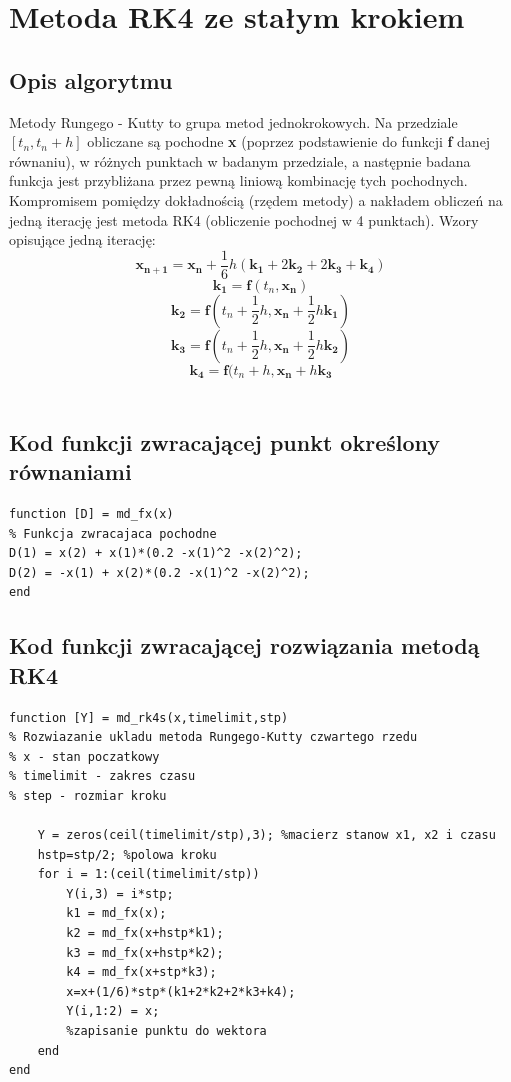 \documentclass[a4paper, 12pt]{article}
\begin{document}
\section{Metoda RK4 ze stałym krokiem}

\subsection{Opis algorytmu}
Metody Rungego - Kutty to grupa metod jednokrokowych. Na przedziale $[t_{n}, t_{n} + h]$ obliczane są pochodne \textbf{x} (poprzez podstawienie do funkcji \textbf{f} danej równaniu), w różnych punktach w badanym przedziale, a następnie badana funkcja jest przybliżana przez pewną liniową kombinację tych pochodnych. Kompromisem pomiędzy dokładnością (rzędem metody) a nakładem obliczeń na jedną iterację jest metoda RK4 (obliczenie pochodnej w 4 punktach). Wzory opisujące jedną iterację:
$$ \mathbf{x_{n+1}} = \mathbf{x_{n}} + \frac{1}{6}h(\mathbf{k_{1}} + 2\mathbf{k_{2}} + 2\mathbf{k_{3}} + \mathbf{k_{4}})$$
$$\mathbf{k_{1}} = \mathbf{f}(t_{n}, \mathbf{x_{n}})$$
$$\mathbf{k_{2}} = \mathbf{f}(t_{n}+\frac{1}{2}h, \mathbf{x_{n}} + \frac{1}{2}h\mathbf{k_{1}})$$
$$\mathbf{k_{3}} = \mathbf{f}(t_{n}+\frac{1}{2}h, \mathbf{x_{n}} + \frac{1}{2}h\mathbf{k_{2}})$$
$$\mathbf{k_{4}} = \mathbf{f}(t_{n}+h, \mathbf{x_{n}} + h\mathbf{k_{3}}$$\\



\subsection{Kod funkcji zwracającej punkt określony równaniami}
\begin{lstlisting}
function [D] = md_fx(x)
% Funkcja zwracajaca pochodne  
D(1) = x(2) + x(1)*(0.2 -x(1)^2 -x(2)^2); 
D(2) = -x(1) + x(2)*(0.2 -x(1)^2 -x(2)^2);
end
\end{lstlisting}
\hspace{5cm}
\subsection{Kod funkcji zwracającej rozwiązania metodą RK4}
\begin{lstlisting}
function [Y] = md_rk4s(x,timelimit,stp)
% Rozwiazanie ukladu metoda Rungego-Kutty czwartego rzedu
% x - stan poczatkowy
% timelimit - zakres czasu
% step - rozmiar kroku

    Y = zeros(ceil(timelimit/stp),3); %macierz stanow x1, x2 i czasu
    hstp=stp/2; %polowa kroku
    for i = 1:(ceil(timelimit/stp))
        Y(i,3) = i*stp;  
        k1 = md_fx(x); 
        k2 = md_fx(x+hstp*k1); 
        k3 = md_fx(x+hstp*k2); 
        k4 = md_fx(x+stp*k3); 
        x=x+(1/6)*stp*(k1+2*k2+2*k3+k4); 
        Y(i,1:2) = x;  
        %zapisanie punktu do wektora
    end
end
\end{lstlisting}
\end{document}

